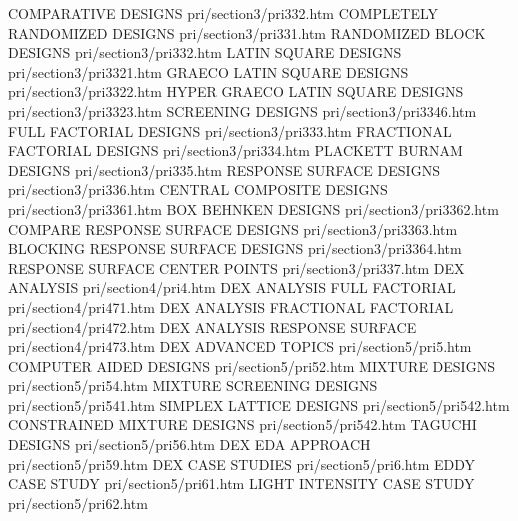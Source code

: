 COMPARATIVE DESIGNS                     pri/section3/pri332.htm
COMPLETELY RANDOMIZED DESIGNS           pri/section3/pri331.htm
RANDOMIZED BLOCK DESIGNS                pri/section3/pri332.htm
LATIN SQUARE DESIGNS                    pri/section3/pri3321.htm
GRAECO LATIN SQUARE DESIGNS             pri/section3/pri3322.htm
HYPER GRAECO LATIN SQUARE DESIGNS       pri/section3/pri3323.htm
SCREENING DESIGNS                       pri/section3/pri3346.htm
FULL FACTORIAL DESIGNS                  pri/section3/pri333.htm
FRACTIONAL FACTORIAL DESIGNS            pri/section3/pri334.htm
PLACKETT BURNAM DESIGNS                 pri/section3/pri335.htm
RESPONSE SURFACE DESIGNS                pri/section3/pri336.htm
CENTRAL COMPOSITE DESIGNS               pri/section3/pri3361.htm
BOX BEHNKEN DESIGNS                     pri/section3/pri3362.htm
COMPARE RESPONSE SURFACE DESIGNS        pri/section3/pri3363.htm
BLOCKING RESPONSE SURFACE DESIGNS       pri/section3/pri3364.htm
RESPONSE SURFACE CENTER POINTS          pri/section3/pri337.htm
DEX ANALYSIS                            pri/section4/pri4.htm
DEX ANALYSIS FULL FACTORIAL             pri/section4/pri471.htm
DEX ANALYSIS FRACTIONAL FACTORIAL       pri/section4/pri472.htm
DEX ANALYSIS RESPONSE SURFACE           pri/section4/pri473.htm
DEX ADVANCED TOPICS                     pri/section5/pri5.htm
COMPUTER AIDED DESIGNS                  pri/section5/pri52.htm
MIXTURE DESIGNS                         pri/section5/pri54.htm
MIXTURE SCREENING DESIGNS               pri/section5/pri541.htm
SIMPLEX LATTICE DESIGNS                 pri/section5/pri542.htm
CONSTRAINED MIXTURE DESIGNS             pri/section5/pri542.htm
TAGUCHI DESIGNS                         pri/section5/pri56.htm
DEX EDA APPROACH                        pri/section5/pri59.htm
DEX CASE STUDIES                        pri/section5/pri6.htm
EDDY CASE STUDY                         pri/section5/pri61.htm
LIGHT INTENSITY CASE STUDY              pri/section5/pri62.htm

